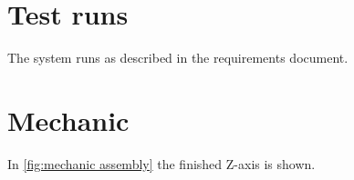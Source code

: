 \documentclass[a4paper,12pt]{scrreprt}
\begin{document}


\section{Test runs}
The system runs as described in the requirements document.

\section{Mechanic}
In \autoref{fig:mechanic assembly} the finished Z-axis is shown.
\end{document}

